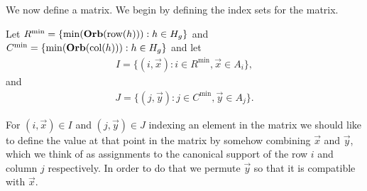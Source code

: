 \documentclass[../paper.tex]{subfiles}
\begin{document}





We now define a matrix. We begin by defining the index sets for the matrix.

Let $R^{\min} = \{\min (\text{\textbf{Orb}}(\text{row}(h))) : h \in H_g\}$ and $C^{\min} = \{ \min
(\text{\textbf{Orb}} (\text{col}(h))) : h \in H_g\}$ and let
\begin{align*}
  I = \{(i, \vec{x}): i \in R^{\min}, \vec{x} \in A_i\},
\end{align*}
and
\begin{align*}
  J = \{(j, \vec{y}): j \in C^{\min}, \vec{y} \in A_j\}.
\end{align*}



For $(i, \vec{x}) \in I$ and $(j, \vec{y}) \in J$ indexing an element in the
matrix we should like to define the value at that point in the matrix by somehow
combining $\vec{x}$ and $\vec{y}$, which we think of as assignments to the
canonical support of the row $i$ and column $j$ respectively. In order to do
that we permute $\vec{y}$ so that it is compatible with $\vec{x}$.
\end{document}
